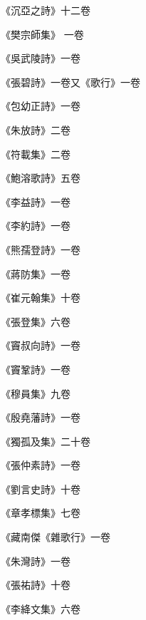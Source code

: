 \begin{pinyinscope}
 《沉亞之詩》十二卷



 《樊宗師集》
 一卷



 《吳武陵詩》一卷



 《張碧詩》一卷又《歌行》一卷



 《包幼正詩》一卷



 《朱放詩》二卷



 《符載集》二卷



 《鮑溶歌詩》五卷



 《李益詩》一卷



 《李約詩》一卷



 《熊孺登詩》一卷



 《蔣防集》一卷



 《崔元翰集》十卷



 《張登集》六卷



 《竇叔向詩》一卷



 《竇鞏詩》一卷



 《穆員集》九卷



 《殷堯藩詩》一卷



 《獨孤及集》二十卷



 《張仲素詩》一卷



 《劉言史詩》十卷



 《章孝標集》七卷



 《藏南傑《雜歌行》一卷



 《朱灣詩》一卷



 《張祐詩》十卷



 《李絳文集》六卷




\end{pinyinscope}
